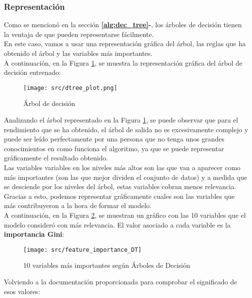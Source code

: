 \subsubsection*{Representación}
Como se mencionó en la sección \textbf{\ref{alg:dec_tree}-}, los árboles de decisión tienen la ventaja de que pueden representarse fácilmente. \\
En este caso, vamos a usar una representación gráfica del árbol, las reglas que ha obtenido el árbol y las variables más importantes.\\
A continuación, en la Figura \ref{fig:decission_tree1}, se muestra la representación gráfica del árbol de decisión entrenado:
\begin{figure}[H]
	\texttt{[image: src/dtree\_plot.png]}
	\caption{Árbol de decisión}
	\label{fig:decission_tree1}
\end{figure}
Analizando el árbol representado en la Figura \ref{fig:decission_tree1}, se puede observar que para el rendimiento que se ha obtenido, el árbol de salida no es excesivamente complejo y puede ser leído perfectamente por una persona que no tenga unos grandes conocimientos en como funciona el algoritmo, ya que se puede representar gráficamente el resultado obtenido. \\
\linebreak
Las variables variables en los niveles más altos son las que van a aparecer como más importantes (son las que mejor dividen el conjunto de datos) y a medida que se desciende por los niveles del árbol, estas variables cobran menos relevancia. \\
Gracias a esto, podemos representar gráficamente cuales son las variables que más contribuyeron a la hora de formar el modelo.\\
\linebreak
A continuación, en la Figura \ref{fig:feature_dtree}, se muestran un gráfico con las 10 variables que el modelo consideró con más relevancia. El valor asociado a cada variable es la \textbf{importancia Gini}:
\begin{figure}[H]
	\centering
	\texttt{[image: src/feature\_importance\_DT]}
	\caption{10 variables más importantes según Árboles de Decisión}
	\label{fig:feature_dtree}
\end{figure}
Volviendo a la documentación proporcionada para comprobar el significado de esos valores:
